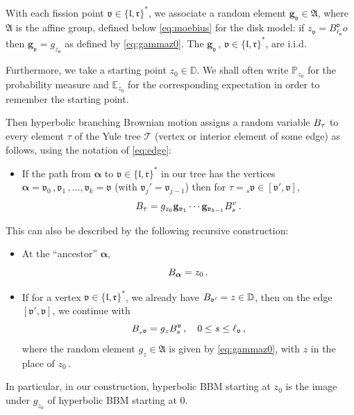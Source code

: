 \documentclass[12pt]{amsart}
\newcommand\Aff{\mathfrak A}
\newcommand\bal{\boldsymbol{\alpha}}
\newcommand\BB{\textit{\textbf{B}}}
\newcommand\E{\mathbb E}
\newcommand\DD{\mathbb D}
\newcommand\gb{\mathbf{g}}
\newcommand\gm{g}
\newcommand\lt{\mathfrak{l}}
\newcommand\Prob{\mathbb P}
\newcommand\rt{\mathfrak{r}}
\newcommand\T{\mathcal T}
\newcommand\vt{\mathfrak{v}}
\numberwithin{theorem}{section}
\theoremstyle{definition}
\begin{document}
With each fission point $\vt \in  \{\lt,\rt\}^*$, we associate a random element $\gb_{\vt} \in \Aff$, 
where $\Aff$ is the affine group, defined below \eqref{eq:moebius} for the disk model:
if $z_{\vt} = B_{\ell_{\vt}}^{\vt}o$ then $\gb_{\vt} = \gm_{z_{\vt}}$ as defined by \eqref{eq:gammaz0}. The 
$\gb_{\vt}\,$, $\vt \in \{\lt,\rt\}^*$, are i.i.d.

Furthermore, we take a starting point $z_0 \in \DD$. We shall often write 
$\Prob_{\! z_0}$ for the probability measure and $\E_{z_0}$ for the corresponding expectation
in order to remember the starting point.

Then hyperbolic branching Brownian 
motion assigns a random variable $\BB_{\tau}$
to every element $\tau$ 
of the Yule tree $\T$ (vertex or interior element of some edge) %
as follows, using the notation of \eqref{eq:edge}: 
\begin{itemize}
 \item[(A)] If the path from $\bal$ to $\vt \in \{\lt,\rt\}^*$ in our tree has 
 the vertices $\bal=\vt_0\,,\vt_1\,,\dots, \vt_k = \vt$
 (with $\vt_j' = \vt_{j-1}$) then for $\tau = {{_s}\vt} \in [\vt',\vt]$,
 $$
 \BB_{\tau} = \gm_{z_0}\gb_{\vt_1}\cdots\gb_{\vt_{k-1}}B_s^v\,.
 $$
\end{itemize}
This can also be described by  the following recursive construction:
\begin{itemize}
 \item [(B1)] At the ``ancestor'' $\bal$, 
 $$
 \BB_{\bal} = z_0\,.
 $$
\item[(B2)] If for a vertex $\vt \in \{\lt,\rt\}^*$, we already have $\BB_{\vt'} = z \in \DD$,  
then on the edge $[\vt',\vt]$, we continue with %
 $$
 \BB_{{{_s}\vt}} = \gm_{z} B_s^{\vt}\,,\quad 0 \le s \le \ell_{\vt}\,,
 $$
where the random element $g_z \in \Aff$ is given by \eqref{eq:gammaz0}, with $z$ in the place of $z_0\,$. 
\end{itemize}
In particular, in our construction, hyperbolic BBM starting at $z_0$ is the image under
$g_{z_0}$ of hyperbolic BBM starting at $0$.
\end{document}
